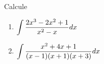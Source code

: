 %
%


%
%
%

\begin{frame}{ }

\begin{casa}
Calcule \begin{enumerate}
\item $\displaystyle\int\frac{2x^3-2x^2+1}{x^2-x}dx$
\item $\displaystyle\int \frac{x^2+4x+1}{(x-1)(x+1)(x+3)}dx$
\end{enumerate}



\end{casa}

\end{frame}

